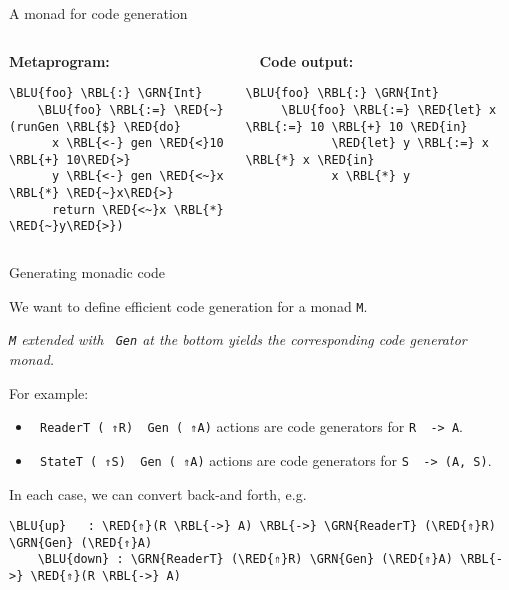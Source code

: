 \documentclass[dvipsnames,aspectratio=169]{beamer}
\theoremstyle{remark}
\newcommand{\RED}[1]{{\color{BrickRed} #1}}
\newcommand{\GRN}[1]{{\color{OliveGreen} #1}}
\newcommand{\RBL}[1]{{\color{RoyalBlue} #1}}
\newcommand{\BLU}[1]{{\color{Blue} #1}}
\begin{document}
\begin{frame}[fragile]{A monad for code generation}

\begin{columns}
\begin{column}{0.4\textwidth}
\textbf{Metaprogram:}
\begin{Verbatim}[commandchars=\\\{\}]
    \BLU{foo} \RBL{:} \GRN{Int}
    \BLU{foo} \RBL{:=} \RED{~}(runGen \RBL{$} \RED{do}
      x \RBL{<-} gen \RED{<}10 \RBL{+} 10\RED{>}
      y \RBL{<-} gen \RED{<~}x \RBL{*} \RED{~}x\RED{>}
      return \RED{<~}x \RBL{*} \RED{~}y\RED{>})
\end{Verbatim}
\end{column}

\begin{column}{0.5\textwidth}
\textbf{$\hspace{1em}$Code output:}
\begin{Verbatim}[commandchars=\\\{\}]
     \BLU{foo} \RBL{:} \GRN{Int}
     \BLU{foo} \RBL{:=} \RED{let} x \RBL{:=} 10 \RBL{+} 10 \RED{in}
            \RED{let} y \RBL{:=} x \RBL{*} x \RED{in}
            x \RBL{*} y

\end{Verbatim}
\end{column}
\end{columns}

\end{frame}

\begin{frame}[fragile]{Generating monadic code}

We want to define efficient code generation for a monad \texttt{M}.
{\center
\begin{block}{}
\center\emph{\texttt{M} extended with \texttt{\GRN{Gen}} at the bottom yields
the corresponding code generator monad.}
\end{block}}

\vspace{1em}

For example:
\begin{itemize}
\item \texttt{\GRN{ReaderT} (\RED{⇑}R) \GRN{Gen} (\RED{⇑}A)} actions
      are code generators for \texttt{R \RBL{->} A}.
\item \texttt{\GRN{StateT} (\RED{⇑}S) \GRN{Gen} (\RED{⇑}A)} actions
      are code generators for \texttt{S \RBL{->} (A, S)}.
\end{itemize}
\vspace{0.5em}

\pause
In each case, we can convert back-and forth, e.g.\
\begin{Verbatim}[commandchars=\\\{\}]
    \BLU{up}   : \RED{⇑}(R \RBL{->} A) \RBL{->} \GRN{ReaderT} (\RED{⇑}R) \GRN{Gen} (\RED{⇑}A)
    \BLU{down} : \GRN{ReaderT} (\RED{⇑}R) \GRN{Gen} (\RED{⇑}A) \RBL{->} \RED{⇑}(R \RBL{->} A)
\end{Verbatim}

\end{frame}
\end{document}
